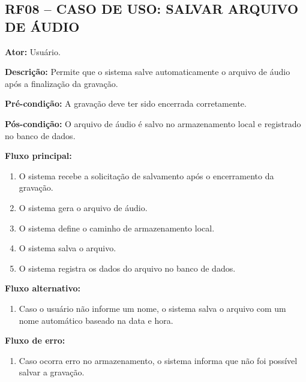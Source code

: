 \documentclass[12pt,oneside,a4paper,brazil,final]{abntex2}
\begin{document}
\clearpage
\subsection*{RF08 -- CASO DE USO: SALVAR ARQUIVO DE ÁUDIO}



\textbf{Ator:} Usuário.



\textbf{Descrição:} Permite que o sistema salve automaticamente o arquivo de áudio após a finalização da gravação.



\textbf{Pré-condição:} A gravação deve ter sido encerrada corretamente.



\textbf{Pós-condição:} O arquivo de áudio é salvo no armazenamento local e registrado no banco de dados.



\textbf{Fluxo principal:}

\begin{enumerate}

    \item O sistema recebe a solicitação de salvamento após o encerramento da gravação.

    \item O sistema gera o arquivo de áudio.

    \item O sistema define o caminho de armazenamento local.

    \item O sistema salva o arquivo.

    \item O sistema registra os dados do arquivo no banco de dados.

\end{enumerate}



\textbf{Fluxo alternativo:}

\begin{enumerate}

    \item Caso o usuário não informe um nome, o sistema salva o arquivo com um nome automático baseado na data e hora.

\end{enumerate}



\textbf{Fluxo de erro:}

\begin{enumerate}

    \item Caso ocorra erro no armazenamento, o sistema informa que não foi possível salvar a gravação.

\end{enumerate}
\end{document}
